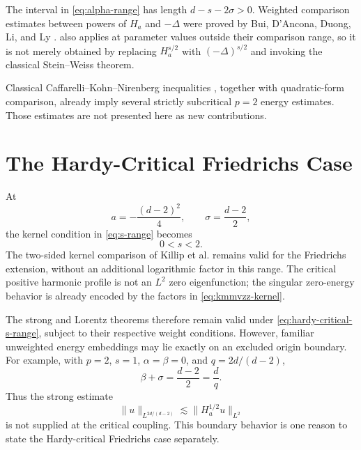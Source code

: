 \documentclass[11pt]{amsart}
\numberwithin{equation}{section}
\theoremstyle{plain}
\theoremstyle{definition}
\theoremstyle{remark}
\newcommand{\Ha}{H_a}
\begin{document}
The interval in \cref{eq:alpha-range} has length $d-s-2\sigma>0$. Weighted comparison estimates between powers of $\Ha$ and $-\Delta$ were proved by Bui, D'Ancona, Duong, Li, and Ly \cite[Theorem~1.1]{BuiEtAl2017}.  also applies at parameter values outside their comparison range, so it is not merely obtained by replacing $\Ha^{s/2}$ with $(-\Delta)^{s/2}$ and invoking the classical Stein--Weiss theorem.

Classical Caffarelli--Kohn--Nirenberg inequalities \cite{CaffarelliKohnNirenberg1984}, together with quadratic-form comparison, already imply several strictly subcritical $p=2$ energy estimates. Those estimates are not presented here as new contributions.

\section{The Hardy-Critical Friedrichs Case}
\label{sec:hardy-critical}

At
\begin{equation}
 a=-\frac{(d-2)^2}{4},
 \qquad
 \sigma=\frac{d-2}{2},
 \label{eq:hardy-critical-parameters}
\end{equation}
the kernel condition in \cref{eq:s-range} becomes
\begin{equation}
 0<s<2.
 \label{eq:hardy-critical-s-range}
\end{equation}
The two-sided kernel comparison of Killip et al. remains valid for the Friedrichs extension, without an additional logarithmic factor in this range. The critical positive harmonic profile is not an $L^2$ zero eigenfunction; the singular zero-energy behavior is already encoded by the factors in \cref{eq:kmmvzz-kernel}.

The strong and Lorentz theorems therefore remain valid under \cref{eq:hardy-critical-s-range}, subject to their respective weight conditions. However, familiar unweighted energy embeddings may lie exactly on an excluded origin boundary. For example, with $p=2$, $s=1$, $\alpha=\beta=0$, and $q=2d/(d-2)$,
\begin{equation}
 \beta+\sigma
 =\frac{d-2}{2}
 =\frac d q.
 \label{eq:critical-energy-boundary}
\end{equation}
Thus the strong estimate
\begin{equation}
 \|u\|_{L^{2d/(d-2)}}
 \lesssim
 \|\Ha^{1/2}u\|_{L^2}
 \label{eq:critical-energy-estimate}
\end{equation}
is not supplied at the critical coupling. This boundary behavior is one reason to state the Hardy-critical Friedrichs case separately.
\end{document}
